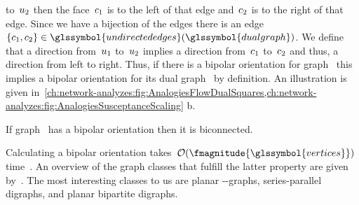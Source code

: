 to~$u_2$ then the face~$c_1$ is to the left of that edge
and~$c_2$ is to the right of that edge. Since we have a bijection of the
edges there is an edge~$
\{\cycle_1,\cycle_2\}\in\glssymbol{undirectededges}(\glssymbol{dualgraph})$. We
define that a direction from~$u_1$ to~$u_2$ implies a direction
from~$c_1$ to~$c_2$ and thus, a direction from left to right. Thus, if
there is a bipolar orientation for graph~ this implies a
bipolar orientation for its dual graph~ by definition. An
illustration is given
in~\cref{ch:network-analyzes:fig:AnalogiesFlowDualSquares,ch:network-analyzes:fig:AnalogiesSusceptanceScaling}
b.
% 
\begin{observation}
    If graph~ has a bipolar orientation then it is biconnected.
\end{observation}
% 
Calculating a bipolar orientation takes~$\bigO(\fmagnitude{
\glssymbol{vertices}})$ time~\parencite{Fel13}. An overview of the graph classes
that fulfill the latter property are given by~\textcite[p.212; Theorem 6.19]
{Bat98}. The most interesting classes to us are planar \source-\sink-graphs,
series-parallel digraphs, and planar bipartite digraphs.
% 
